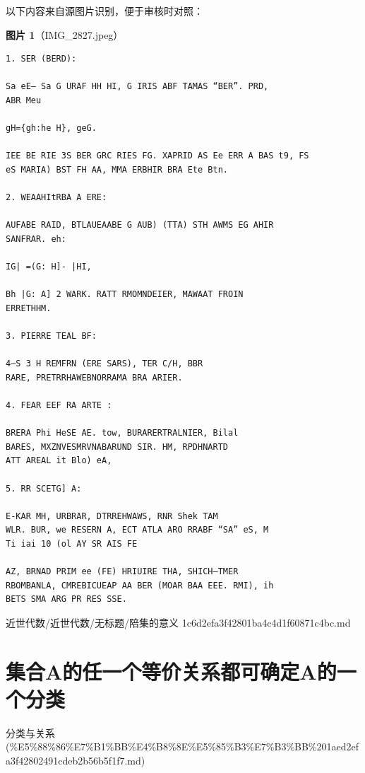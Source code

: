 \begin{note}
以下内容来自源图片识别，便于审核时对照：

\textbf{图片 1}（IMG\_2827.jpeg）
\begin{Verbatim}[fontsize=\small]
1. SER (BERD):

Sa eE— Sa G URAF HH HI, G IRIS ABF TAMAS “BER”. PRD,
ABR Meu

gH={gh:he H}, geG.

IEE BE RIE 3S BER GRC RIES FG. XAPRID AS Ee ERR A BAS t9, FS
eS MARIA) BST FH AA, MMA ERBHIR BRA Ete Btn.

2. WEAAHItRBA A ERE:

AUFABE RAID, BTLAUEAABE G AUB) (TTA) STH AWMS EG AHIR
SANFRAR. eh:

IG| =(G: H]- |HI,

Bh |G: A] 2 WARK. RATT RMOMNDEIER, MAWAAT FROIN
ERRETHHM.

3. PIERRE TEAL BF:

4—S 3 H REMFRN (ERE SARS), TER C/H, BBR
RARE, PRETRRHAWEBNORRAMA BRA ARIER.

4. FEAR EEF RA ARTE :

BRERA Phi HeSE AE. tow, BURARERTRALNIER, Bilal
BARES, MXZNVESMRVNABARUND SIR. HM, RPDHNARTD
ATT AREAL it Blo) eA,

5. RR SCETG] A:

E-KAR MH, URBRAR, DTRREHWAWS, RNR Shek TAM
WLR. BUR, we RESERN A, ECT ATLA ARO RRABF “SA” eS, M
Ti iai 10 (ol AY SR AIS FE

AZ, BRNAD PRIM ee (FE) HRIUIRE THA, SHICH—TMER
RBOMBANLA, CMREBICUEAP AA BER (MOAR BAA EEE. RMI), ih
BETS SMA ARG PR RES SSE.
\end{Verbatim}

\end{note}

\begin{note}[来源路径]

近世代数/近世代数/无标题/陪集的意义 1c6d2efa3f42801ba4c4d1f60871c4bc.md

\end{note}

\section*{集合A的任一个等价关系都可确定A的一个分类}

\begin{note}[来源上级主题]

分类与关系 (\%E5\%88\%86\%E7\%B1\%BB\%E4\%B8\%8E\%E5\%85\%B3\%E7\%B3\%BB\%201aed2efa3f42802491cdeb2b56b5f1f7.md)

\end{note}

